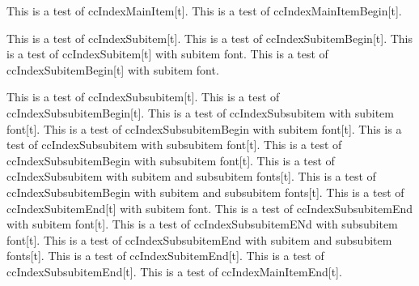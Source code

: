 \documentclass{article}
\begin{document}
{{{{\pagebreak

This is a test of ccIndexMainItem[t].
This is a test of ccIndexMainItemBegin[t].

This is a test of ccIndexSubitem[t].
This is a test of ccIndexSubitemBegin[t].
This is a test of ccIndexSubitem[t] with subitem font.
This is a test of ccIndexSubitemBegin[t] with subitem font.

This is a test of ccIndexSubsubitem[t].
This is a test of ccIndexSubsubitemBegin[t].
This is a test of ccIndexSubsubitem with subitem font[t].
This is a test of ccIndexSubsubitemBegin with subitem font[t].
This is a test of ccIndexSubsubitem with subsubitem font[t].
This is a test of ccIndexSubsubitemBegin with subsubitem font[t].
This is a test of ccIndexSubsubitem with subitem and subsubitem fonts[t].
This is a test of ccIndexSubsubitemBegin with subitem and subsubitem fonts[t].
\pagebreak
This is a test of ccIndexSubitemEnd[t] with subitem font.
This is a test of ccIndexSubsubitemEnd with subitem font[t].
This is a test of ccIndexSubsubitemENd with subsubitem font[t].
This is a test of ccIndexSubsubitemEnd with subitem and subsubitem fonts[t].
This is a test of ccIndexSubitemEnd[t].
This is a test of ccIndexSubsubitemEnd[t].
This is a test of ccIndexMainItemEnd[t].

}}}}
\end{document}
